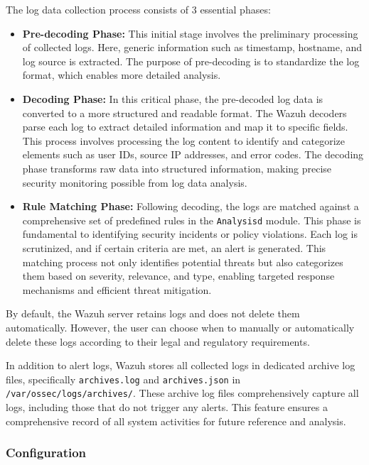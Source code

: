 The log data collection process consists of 3 essential phases:
\begin{itemize}
    \item \textbf{Pre-decoding Phase: } This initial stage involves the preliminary processing of collected logs. Here, generic information such as timestamp, hostname, and log source is extracted. The purpose of pre-decoding is to standardize the log format, which enables more detailed analysis.
    \item \textbf{Decoding Phase: } In this critical phase, the pre-decoded log data is converted to a more structured and readable format. The Wazuh decoders parse each log to extract detailed information and map it to specific fields. This process involves processing the log content to identify and categorize elements such as user IDs, source IP addresses, and error codes. The decoding phase transforms raw data into structured information, making precise security monitoring possible from log data analysis.
    \item \textbf{Rule Matching Phase: } Following decoding, the logs are matched against a comprehensive set of predefined rules in the \texttt{Analysisd} module. This phase is fundamental to identifying security incidents or policy violations. Each log is scrutinized, and if certain criteria are met, an alert is generated. This matching process not only identifies potential threats but also categorizes them based on severity, relevance, and type, enabling targeted response mechanisms and efficient threat mitigation.
\end{itemize}


By default, the Wazuh server retains logs and does not delete them automatically. However, the user can choose when to manually or automatically delete these logs according to their legal and regulatory requirements.

In addition to alert logs, Wazuh stores all collected logs in dedicated archive log files, specifically \texttt{archives.log} and \texttt{archives.json} in \texttt{/var/ossec/logs/archives/}. These archive log files comprehensively capture all logs, including those that do not trigger any alerts. This feature ensures a comprehensive record of all system activities for future reference and analysis.

\subsubsection{Configuration}

